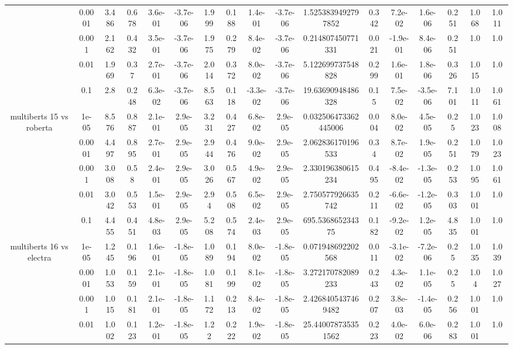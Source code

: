 \begin{tabular}{|c|c|c|c|c|c|c|c|c|c|c|c|c|c|c|c|c|}
 & 0.0001 & 3.486 & 0.678 & 3.6e-01 & -3.7e-06 & 1.999 & 0.188 & 1.4e-01 & -3.7e-06 & 1.5253839492797852 & 0.342 & 7.2e-02 & 1.6e-06 & 0.251 & 1.068 & 1.011 \\
 & 0.001 & 2.162 & 0.432 & 3.5e-01 & -3.7e-06 & 1.975 & 0.279 & 8.4e-02 & -3.7e-06 & 0.214807450771331 & 0.021 & -1.9e-01 & 8.4e-06 & 0.251 & 1.0 & 1.0 \\
 & 0.01 & 1.969 & 0.37 & 2.7e-01 & -3.7e-06 & 2.014 & 0.372 & 8.0e-02 & -3.7e-06 & 5.122699737548828 & 0.299 & 1.6e-01 & 1.8e-06 & 0.326 & 1.015 & 1.0 \\
 & 0.1 & 2.8 & 0.248 & 6.3e-02 & -3.7e-06 & 8.563 & 0.118 & -3.3e-02 & -3.7e-06 & 19.63690948486328 & 0.15 & 7.5e-02 & -3.5e-06 & 7.101 & 1.011 & 1.061 \\
\hline
\multirow{5}{*}{multiberts 15 vs roberta } & 1e-05 & 8.576 & 0.887 & 2.1e-01 & 2.9e-05 & 3.231 & 0.427 & 6.8e-02 & 2.9e-05 & 0.032506473362445006 & 0.004 & 8.0e-02 & 4.5e-05 & 0.25 & 1.023 & 1.008 \\
 & 0.0001 & 4.497 & 0.895 & 2.7e-01 & 2.9e-05 & 2.944 & 0.476 & 9.0e-02 & 2.9e-05 & 2.062836170196533 & 0.34 & 8.7e-02 & 1.9e-05 & 0.251 & 1.079 & 1.023 \\
 & 0.001 & 3.008 & 0.58 & 2.4e-01 & 2.9e-05 & 3.026 & 0.567 & 4.9e-02 & 2.9e-05 & 2.330196380615234 & 0.495 & -8.4e-02 & -1.3e-05 & 0.253 & 1.095 & 1.061 \\
 & 0.01 & 3.042 & 0.553 & 1.5e-01 & 2.9e-05 & 2.94 & 0.508 & 6.5e-02 & 2.9e-05 & 2.750577926635742 & 0.211 & -6.6e-02 & -1.2e-05 & 0.303 & 1.001 & 1.0 \\
 & 0.1 & 4.455 & 0.451 & 4.8e-03 & 2.9e-05 & 5.208 & 0.574 & 2.4e-03 & 2.9e-05 & 695.536865234375 & 0.182 & -9.2e-02 & 1.2e-05 & 4.835 & 1.001 & 1.0 \\
\hline
\multirow{5}{*}{multiberts 16 vs electra } & 1e-05 & 1.245 & 0.196 & 1.6e-01 & -1.8e-05 & 1.089 & 0.194 & 8.0e-02 & -1.8e-05 & 0.071948692202568 & 0.011 & -3.1e-02 & -7.2e-06 & 0.25 & 1.035 & 1.039 \\
 & 0.0001 & 1.053 & 0.159 & 2.1e-01 & -1.8e-05 & 1.081 & 0.199 & 8.1e-02 & -1.8e-05 & 3.272170782089233 & 0.243 & 4.3e-02 & 1.1e-05 & 0.25 & 1.04 & 1.027 \\
 & 0.001 & 1.015 & 0.181 & 2.1e-01 & -1.8e-05 & 1.172 & 0.213 & 8.4e-02 & -1.8e-05 & 2.4268405437469482 & 0.207 & 3.8e-03 & -1.4e-05 & 0.256 & 1.001 & 1.0 \\
 & 0.01 & 1.002 & 0.123 & 1.2e-01 & -1.8e-05 & 1.22 & 0.222 & 1.9e-02 & -1.8e-05 & 25.440078735351562 & 0.223 & 4.0e-02 & 6.0e-06 & 0.283 & 1.001 & 1.0 \\

\end{tabular}
